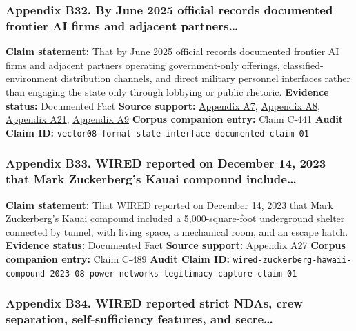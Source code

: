 \documentclass[
  american,
  11pt,
  letterpaper,
]{article}
\begin{document}
\subsubsection{Appendix B32. By June 2025 official records documented
frontier AI firms and adjacent
partners\ldots{}}\label{appendix-b32-by-june-2025-official-records-documented-frontier-ai-firms-and-adjacent-partners}

\textbf{Claim statement:} That by June 2025 official records documented
frontier AI firms and adjacent partners operating government-only
offerings, classified-environment distribution channels, and direct
military personnel interfaces rather than engaging the state only
through lobbying or public rhetoric. \textbf{Evidence status:}
Documented Fact \textbf{Source support:}
\hyperref[appendix-a7-introducing-openai-for-government]{Appendix A7},
\hyperref[appendix-a8-claude-gov-models-for-u-s-national-security-customers]{Appendix
A8},
\hyperref[appendix-a21-anthropic-and-palantir-partner-to-bring-claude-ai-models-to-aws-for-u-s-government-intelligence-and-defense-operations]{Appendix
A21},
\hyperref[appendix-a9-army-launches-detachment-201-executive-innovation-corps-to-drive-tech-transformation]{Appendix
A9} \textbf{Corpus companion entry:} Claim C-441 \textbf{Audit Claim
ID:} \texttt{vector08-formal-state-interface-documented-claim-01}

\subsubsection{Appendix B33. WIRED reported on December 14, 2023 that
Mark Zuckerberg's Kauai compound
include\ldots{}}\label{appendix-b33-wired-reported-on-december-14-2023-that-mark-zuckerberg-s-kauai-compound-include}

\textbf{Claim statement:} That WIRED reported on December 14, 2023 that
Mark Zuckerberg's Kauai compound included a 5,000-square-foot
underground shelter connected by tunnel, with living space, a mechanical
room, and an escape hatch. \textbf{Evidence status:} Documented Fact
\textbf{Source support:}
\hyperref[appendix-a27-inside-mark-zuckerbergs-top-secret-hawaii-compound]{Appendix
A27} \textbf{Corpus companion entry:} Claim C-489 \textbf{Audit Claim
ID:}
\texttt{wired-zuckerberg-hawaii-compound-2023-08-power-networks-legitimacy-capture-claim-01}

\subsubsection{Appendix B34. WIRED reported strict NDAs, crew
separation, self-sufficiency features, and
secre\ldots{}}\label{appendix-b34-wired-reported-strict-ndas-crew-separation-self-sufficiency-features-and-secre}
\end{document}
